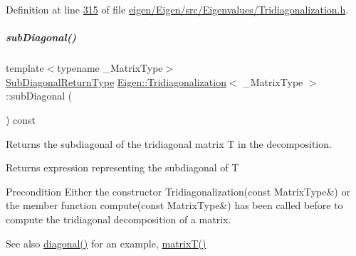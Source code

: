 Definition at line \hyperlink{eigen_2_eigen_2src_2_eigenvalues_2_tridiagonalization_8h_source_l00315}{315} of file \hyperlink{eigen_2_eigen_2src_2_eigenvalues_2_tridiagonalization_8h_source}{eigen/\+Eigen/src/\+Eigenvalues/\+Tridiagonalization.\+h}.

\mbox{\label{group___eigenvalues___module_a5b2b4e8e38575564f7e8c89d2105fcc5}} 
\subparagraph{\texorpdfstring{sub\+Diagonal()}{subDiagonal()}\hspace{0.1cm}{\footnotesize\ttfamily [2/2]}}
{\footnotesize\ttfamily template$<$typename \+\_\+\+Matrix\+Type$>$ \\
\hyperlink{class_eigen_1_1internal_1_1_tensor_lazy_evaluator_writable}{Sub\+Diagonal\+Return\+Type} \hyperlink{group___eigenvalues___module_class_eigen_1_1_tridiagonalization}{Eigen\+::\+Tridiagonalization}$<$ \+\_\+\+Matrix\+Type $>$\+::sub\+Diagonal (\begin{DoxyParamCaption}{ }\end{DoxyParamCaption}) const}



Returns the subdiagonal of the tridiagonal matrix T in the decomposition. 

\begin{DoxyReturn}{Returns}
expression representing the subdiagonal of T
\end{DoxyReturn}
\begin{DoxyPrecond}{Precondition}
Either the constructor Tridiagonalization(const Matrix\+Type\&) or the member function compute(const Matrix\+Type\&) has been called before to compute the tridiagonal decomposition of a matrix.
\end{DoxyPrecond}
\begin{DoxySeeAlso}{See also}
\hyperlink{group___eigenvalues___module_a0b7ff4860aa6f7c0761b1059c012fd8e}{diagonal()} for an example, \hyperlink{group___eigenvalues___module_a6eb5ef94b8b9bb013c0e69b6df56d0df}{matrix\+T()} 
\end{DoxySeeAlso}
